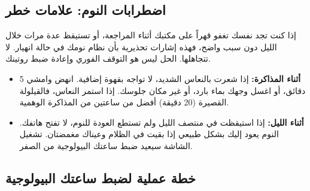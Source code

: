 \documentclass[12pt,a4paper]{book}
\begin{document}
\subsection{اضطرابات النوم: علامات خطر}

إذا كنت تجد نفسك تغفو قهراً على مكتبك أثناء المراجعة، أو تستيقظ عدة مرات خلال الليل دون سبب واضح، فهذه إشارات تحذيرية بأن نظام نومك في حالة انهيار. لا تتجاهلها. الحل ليس هو التوقف الفوري وإعادة ضبط روتينك.

\begin{itemize}
	\item \textbf{أثناء المذاكرة:} إذا شعرت بالنعاس الشديد، لا تواجه بقهوة إضافية. انهض وامشي 5 دقائق، أو اغسل وجهك بماء بارد، أو غير مكان جلوسك. إذا استمر النعاس، فالقيلولة القصيرة (20 دقيقة) أفضل من ساعتين من المذاكرة الوهمية.
	\item \textbf{أثناء الليل:} إذا استيقظت في منتصف الليل ولم تستطع العودة للنوم، لا تفتح هاتفك. النوم يعود إليك بشكل طبيعي إذا بقيت في الظلام وعيناك مغمضتان. تشغيل الشاشة سيعيد ضبط ساعتك البيولوجية من الصفر.
\end{itemize}

\subsection{خطة عملية لضبط ساعتك البيولوجية}
\end{document}
